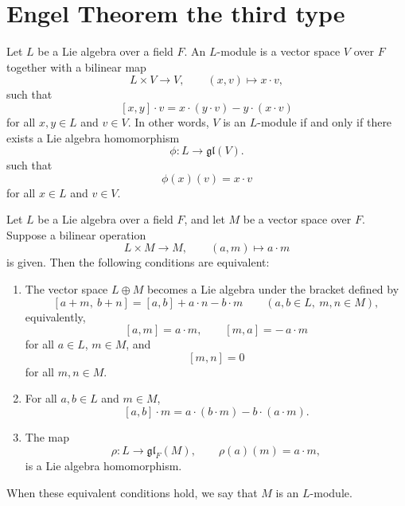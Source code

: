 \section{Engel Theorem the third type}

\begin{definition}
    Let $L$ be a Lie algebra over a field $F$. An $L$-module is a vector space $V$ over $F$ together with a bilinear map
    \[
        L\times V \to V,\qquad (x,v)\mapsto x\cdot v,
    \]
    such that
    \[
        [x,y]\cdot v = x\cdot (y\cdot v)-y\cdot (x\cdot v)
    \]
    for all $x,y\in L$ and $v\in V$. In other words, $V$ is an $L$-module if and only if there exists a Lie algebra homomorphism
    \[
        \phi:L\to \mathfrak{gl}(V).
    \]
    such that
    \[
        \phi(x)(v) = x\cdot v
    \]
    for all $x\in L$ and $v\in V$.
\end{definition}

\begin{proposition}
    Let $L$ be a Lie algebra over a field $F$, and let $M$ be a vector space over $F$. Suppose a bilinear operation
    \[
        L\times M\to M,\qquad (a,m)\mapsto a\cdot m
    \]
    is given. Then the following conditions are equivalent:

    \begin{enumerate}
        \item The vector space $L\oplus M$ becomes a Lie algebra under the bracket defined by
              \[
                  [a+m,\ b+n]=[a,b]+a\cdot n-b\cdot m
                  \qquad (a,b\in L,\ m,n\in M),
              \]
              equivalently,
              \[
                  [a,m]=a\cdot m,\qquad [m,a]=-\,a\cdot m
              \]
              for all $a\in L$, $m\in M$, and
              \[
                  [m,n]=0
              \]
              for all $m,n\in M$.

        \item For all $a,b\in L$ and $m\in M$,
              \[
                  [a,b]\cdot m=a\cdot (b\cdot m)-b\cdot (a\cdot m).
              \]

        \item The map
              \[
                  \rho:L\to \mathfrak{gl}_F(M),\qquad \rho(a)(m)=a\cdot m,
              \]
              is a Lie algebra homomorphism.
    \end{enumerate}

    When these equivalent conditions hold, we say that $M$ is an $L$-module.
\end{proposition}

